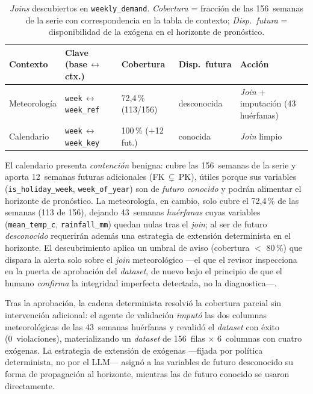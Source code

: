 \begin{table}[H]
\centering
\caption{\textit{Joins} descubiertos en \texttt{weekly\_demand}. \textit{Cobertura} =
 fracción de las 156~semanas de la serie con correspondencia en la tabla de contexto;
 \textit{Disp.\ futura} = disponibilidad de la exógena en el horizonte de pronóstico.}
\label{tab:joins-imperfectos}
\small
\setlength{\tabcolsep}{4pt}
\begin{tabular}{lllll}
\toprule
\textbf{Contexto} & \textbf{Clave (base\,$\leftrightarrow$\,ctx.)}
  & \textbf{Cobertura} & \textbf{Disp.\ futura} & \textbf{Acción} \\
\midrule
Meteorología & \texttt{week}$\,\leftrightarrow\,$\texttt{week\_ref}
             & 72,4\,\% (113/156) & desconocida & \textit{Join} + imputación (43 huérfanas) \\
Calendario   & \texttt{week}$\,\leftrightarrow\,$\texttt{week\_key}
             & 100\,\% ($+$12 fut.) & conocida & \textit{Join} limpio \\
\bottomrule
\end{tabular}
\end{table}

El calendario presenta \emph{contención} benigna: cubre las 156~semanas de la serie y aporta
12~semanas futuras adicionales (FK\,$\subsetneq$\,PK), útiles porque sus variables
(\texttt{is\_holiday\_week}, \texttt{week\_of\_year}) son de \emph{futuro conocido} y podrán
alimentar el horizonte de pronóstico. La meteorología, en cambio, solo cubre el 72,4\,\% de
las semanas (113 de 156), dejando 43~semanas \emph{huérfanas} cuyas variables
(\texttt{mean\_temp\_c}, \texttt{rainfall\_mm}) quedan nulas tras el \textit{join}; al ser de
futuro \emph{desconocido} requerirán además una estrategia de extensión determinista en el
horizonte. El descubrimiento aplica un umbral de aviso (cobertura $<$ 80\,\%) que dispara la
alerta solo sobre el \textit{join} meteorológico —el que el revisor inspecciona en la puerta
de aprobación del \textit{dataset}, de nuevo bajo el principio de que el humano
\emph{confirma} la integridad imperfecta detectada, no la diagnostica—.

Tras la aprobación, la cadena determinista resolvió la cobertura parcial sin intervención
adicional: el agente de validación \emph{imputó} las dos columnas meteorológicas de las
43~semanas huérfanas y revalidó el \textit{dataset} con éxito (0~violaciones), materializando
un \textit{dataset} de 156~filas $\times$ 6~columnas con cuatro exógenas. La estrategia de
extensión de exógenas —fijada por política determinista, no por el LLM— asignó a las
variables de futuro desconocido su forma de propagación al horizonte, mientras las de futuro
conocido se usaron directamente.

